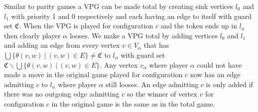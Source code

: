 Similar to parity games a VPG can be made total by creating sink vertices $l_0$ and $l_1$ with priority 1 and 0 respectively and each having an edge to itself with guard set $\mathfrak{C}$. When the VPG is played for configuration $c$ and the token ends up in $l_\alpha$ then clearly player $\alpha$ looses. We make a VPG total by adding vertices $l_0$ and $l_1$ and adding an edge from every vertex $v \in V_\alpha$ that has $\bigcup \{ \theta(v,w)\ |\ (v,w) \in E \} \neq \mathfrak{C}$ to $l_\alpha$ with guard set $\mathfrak{C} \backslash \bigcup \{ \theta(v,w)\ |\ (v,w) \in E \}$. Any vertex $v_\alpha$ where player $\alpha$ could not have made a move in the original game played for configuration $c$ now has an edge admitting $c$ to $l_\alpha$ where player $\alpha$ still looses. An edge admitting $c$ is only added if there was no outgoing edge admitting $c$ so the winner of vertex $v$ for configuration $c$ in the original game is the same as in the total game.

